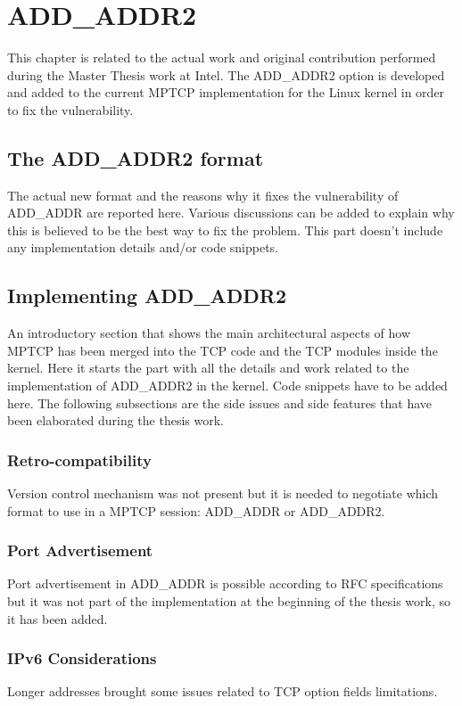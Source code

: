 \chapter{ADD\_ADDR2}
\label{chap:addaddr2}

This chapter is related to the actual work and original contribution performed during the Master Thesis work at Intel. The ADD\_ADDR2 option is developed and added to the current MPTCP implementation for the Linux kernel in order to fix the vulnerability.

\section{The ADD\_ADDR2 format}
The actual new format and the reasons why it fixes the vulnerability of ADD\_ADDR are reported here. Various discussions can be added to explain why this is believed to be the best way to fix the problem. This part doesn't include any implementation details and/or code snippets.

\section{Implementing ADD\_ADDR2}
An introductory section that shows the main architectural aspects of how MPTCP has been merged into the TCP code and the TCP modules inside the kernel.
Here it starts the part with all the details and work related to the implementation of ADD\_ADDR2 in the kernel. Code snippets have to be added here. The following subsections are the side issues and side features that have been elaborated during the thesis work.

\subsection{Retro-compatibility}
Version control mechanism was not present but it is needed to negotiate which format to use in a MPTCP session: ADD\_ADDR or ADD\_ADDR2.

\subsection{Port Advertisement}
Port advertisement in ADD\_ADDR is possible according to RFC specifications but it was not part of the implementation at the beginning of the thesis work, so it has been added.

\subsection{IPv6 Considerations}
Longer addresses brought some issues related to TCP option fields limitations.

